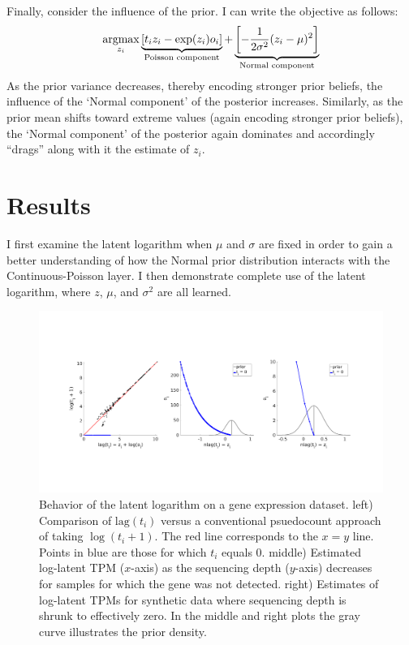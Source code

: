 \documentclass[11pt]{article}
\newcommand{\argmax}{\operatornamewithlimits{argmax}}
\begin{document}
Finally, consider the influence of the prior. I can write the objective as follows:
\[
\argmax_{z_i} \underbrace{[t_i z_i - \exp(z_i)o_i]}_{\textrm{Poisson component}} + \underbrace{\left[-\frac{1}{2\sigma^2}(z_i - \mu)^2\right]}_{\textrm{Normal component}}
\]
As the prior variance decreases, thereby encoding stronger prior beliefs, the influence of the `Normal component' of the posterior increases. Similarly, as the prior mean shifts toward extreme values (again encoding stronger prior beliefs), the `Normal component' of the posterior again dominates and accordingly ``drags'' along with it the estimate of $z_i$.  

\section{Results}

I first examine the latent logarithm when $\mu$ and $\sigma$ are fixed in order to gain a better understanding of how the Normal prior distribution interacts with the Continuous-Poisson layer. I then demonstrate complete use of the latent logarithm, where $z$, $\mu$, and $\sigma^2$ are all learned. 

\begin{figure}[t!]
\centering
\includegraphics[trim={1cm 6cm 1cm 7cm},clip,width=\textwidth]{figure1.png}
\caption{Behavior of the latent logarithm on a gene expression dataset. left) Comparison of $\textrm{lag}(t_i)$ versus a conventional psuedocount approach of taking $\log(t_i + 1)$. The red line corresponds to the $x = y$ line. Points in blue are those for which $t_i$ equals 0. middle) Estimated log-latent TPM ($x$-axis) as the sequencing depth ($y$-axis) decreases for samples for which the gene was not detected. right) Estimates of log-latent TPMs for synthetic data where sequencing depth is shrunk to effectively zero. In the middle and right plots the gray curve illustrates the prior density.}
\end{figure}
\end{document}
